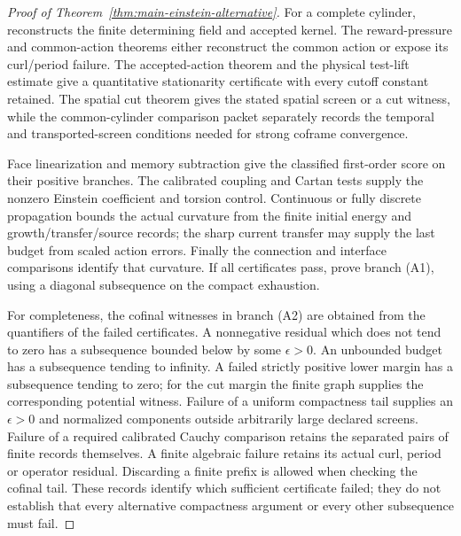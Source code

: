 \documentclass[11pt]{article}
\theoremstyle{definition}
\theoremstyle{remark}
\begin{document}
\begin{proof}[Proof of Theorem~\ref{thm:main-einstein-alternative}]
For a complete cylinder,  reconstructs the
finite determining field and accepted kernel.  The reward-pressure and
common-action theorems either reconstruct the common action or expose its
curl/period failure.  The accepted-action theorem and the physical test-lift
estimate give a quantitative stationarity certificate with every cutoff
constant retained.  The spatial cut theorem gives the stated spatial screen
or a cut witness, while the common-cylinder comparison packet separately
records the temporal and transported-screen conditions needed for strong
coframe convergence.

Face linearization and memory subtraction give the classified first-order
score on their positive branches.  The calibrated coupling and Cartan tests
supply the nonzero Einstein coefficient and torsion control.  Continuous or
fully discrete propagation bounds the actual curvature from the finite
initial energy and growth/transfer/source records; the sharp current transfer
may supply the last budget from scaled action errors.  Finally the connection
and interface comparisons identify that curvature.  If all certificates pass,
 prove branch
\textup{(A1)}, using a diagonal subsequence on the compact exhaustion.

For completeness, the cofinal witnesses in branch \textup{(A2)} are obtained
from the quantifiers of the failed certificates.  A nonnegative residual
which does not tend to zero has a subsequence bounded below by some
$\epsilon>0$.  An unbounded budget has a subsequence tending to infinity.
A failed strictly positive lower margin has a subsequence tending to zero;
for the cut margin the finite graph supplies the corresponding potential
witness.  Failure of a uniform compactness tail supplies an $\epsilon>0$
and normalized components outside arbitrarily large declared screens.
Failure of a required calibrated Cauchy comparison retains the separated
pairs of finite records themselves.  A finite algebraic failure retains its
actual curl, period or operator residual.  Discarding a finite prefix is
allowed when checking the cofinal tail.  These records identify which
sufficient certificate failed; they do not establish that every alternative
compactness argument or every other subsequence must fail.
\end{proof}
\end{document}
